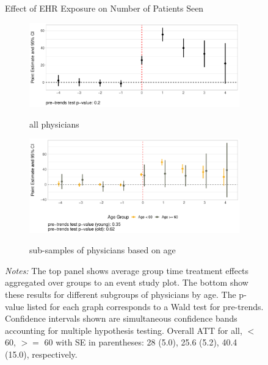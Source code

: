 \documentclass[12pt]{article}
\begin{document}
\begin{figure}[ht!]
\centering
    \captionsetup{width=.85\linewidth}
    \caption{Effect of EHR Exposure on Number of Patients Seen}
   \begin{subfigure}[]{.8\textwidth}
   \caption{all physicians}
   \includegraphics[scale=.55]{Objects/patient_plot_all.pdf}
   \label{fig:patienta} 
\end{subfigure}

\vspace{3mm}

\begin{subfigure}[]{.8\textwidth}
\caption{sub-samples of physicians based on age}
   \includegraphics[scale=.55]{Objects/patient_plot_ages.pdf}
   \label{fig:patientb}
\end{subfigure}
\vspace{2mm}
    \caption*{\footnotesize{\textit{Notes:} The top panel shows average group time treatment effects aggregated over groups to an event study plot. The bottom show these results for different subgroups of physicians by age. The p-value listed for each graph corresponds to a Wald test for pre-trends. Confidence intervals shown are simultaneous confidence bands accounting for multiple hypothesis testing. Overall ATT for all, $<$ 60, $>=$ 60 with SE in parentheses: 28 (5.0), 25.6 (5.2), 40.4 (15.0), respectively.}}
\end{figure}
\end{document}
